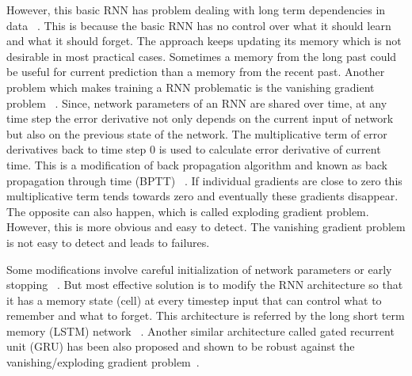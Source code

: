 \documentclass[10pt,twocolumn,letterpaper]{article}
\begin{document}
However, this 
basic RNN has problem dealing with long term dependencies in data ~\cite{DBLP:journals/corr/abs-1211-5063}. This is because the 
basic RNN has no control over what it should learn and what it 
should forget. The approach keeps updating its memory which is not desirable in most practical cases. Sometimes a memory from the 
long past could be useful for current prediction than a memory from the recent past. Another problem which makes training a RNN problematic 
is the  vanishing gradient problem ~\cite{DBLP:journals/corr/abs-1211-5063}. Since,  network parameters of an RNN are shared over time, at any time step the error derivative not only depends on the current input of network but also on the previous state of the network. The 
multiplicative term of error derivatives back to time step $0$ is used 
to calculate error derivative of current time. This is a modification of back propagation algorithm and known as
back propagation through time (BPTT) ~\cite{58337}. If individual gradients are close to zero this multiplicative term tends towards 
zero and eventually these 
gradients disappear. The opposite can also happen, which is called exploding gradient problem.  However,
this is more obvious and easy to detect. The vanishing gradient problem is not easy to detect and leads to failures. 

Some modifications involve 
careful initialization of network parameters or  early stopping  ~\cite{DBLP:journals/corr/abs-1211-5063}. But most effective solution is 
to modify the RNN architecture so that it has a memory state (cell) at every timestep input  that can control what to remember and what to forget. This architecture is referred by the 
long short term memory (LSTM) network ~\cite{Hochreiter:1997:LSM:1246443.1246450}. Another similar architecture called gated recurrent unit (GRU) has been also proposed and shown to be robust
against the 
vanishing/exploding gradient problem~\cite{DBLP:journals/corr/ChoMGBSB14}.
\end{document}
